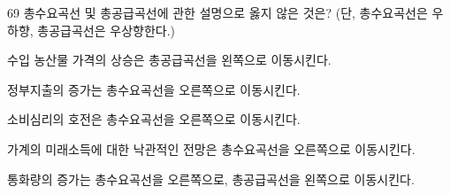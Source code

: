 \begin{question}{69}
총수요곡선 및 총공급곡선에 관한 설명으로 옳지 않은 것은? (단, 총수요곡선은 우하향, 총공급곡선은 우상향한다.)
\begin{choices}
  \item 수입 농산물 가격의 상승은 총공급곡선을 왼쪽으로 이동시킨다.
  \item 정부지출의 증가는 총수요곡선을 오른쪽으로 이동시킨다.
  \item 소비심리의 호전은 총수요곡선을 오른쪽으로 이동시킨다.
  \item 가계의 미래소득에 대한 낙관적인 전망은 총수요곡선을 오른쪽으로 이동시킨다.
  \item 통화량의 증가는 총수요곡선을 오른쪽으로, 총공급곡선을 왼쪽으로 이동시킨다.
\end{choices}
\end{question}
